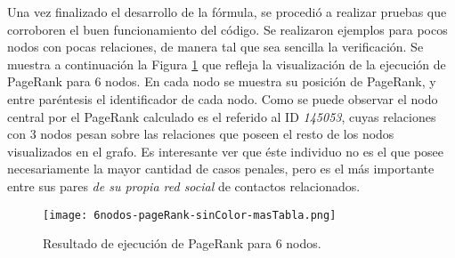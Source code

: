 Una vez finalizado el desarrollo de la fórmula, se procedió a realizar pruebas que corroboren el buen funcionamiento del código. Se realizaron ejemplos para pocos nodos con pocas relaciones, de manera tal que sea sencilla la verificación. Se muestra a continuación la Figura \ref{fig:6nodos-pageRank-sinColor-masTabla} que refleja la visualización de la ejecución de PageRank para 6 nodos. En cada nodo se muestra su posición de PageRank, y entre paréntesis el identificador de cada nodo. Como se puede observar el nodo central por el PageRank calculado es el referido al ID \textit{145053}, cuyas relaciones con 3 nodos pesan sobre las relaciones que poseen el resto de los nodos visualizados en el grafo.
Es interesante ver que éste individuo no es el que posee necesariamente la mayor cantidad de casos penales, pero es el más importante entre sus pares \textit{de su propia red social} de contactos relacionados.


	
\begin{figure}
	\centering
	\texttt{[image: 6nodos-pageRank-sinColor-masTabla.png]}
	\caption{Resultado de ejecución de PageRank para 6 nodos.} 
	\label{fig:6nodos-pageRank-sinColor-masTabla}
\end{figure}



